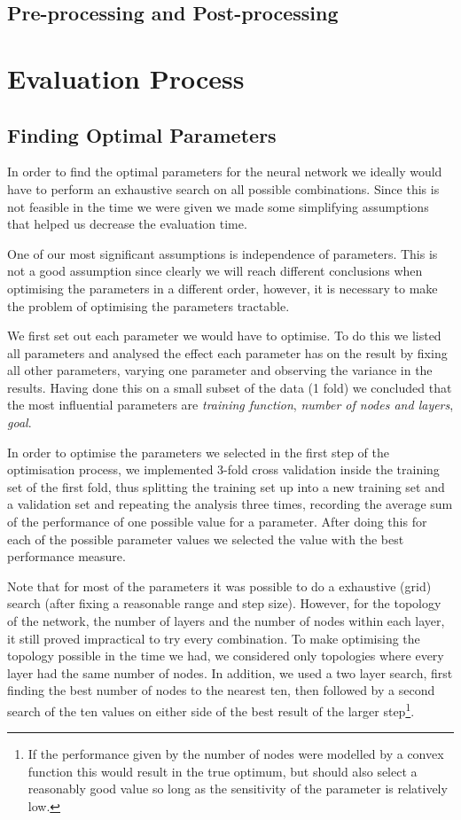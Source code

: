 \documentclass[10pt,a4paper]{article}
\begin{document}
\subsection{Pre-processing and Post-processing}



\section{Evaluation Process}

\subsection{Finding Optimal Parameters}
In order to find the optimal parameters for the neural network we ideally would have to perform an exhaustive search on all possible combinations. Since this is not feasible in the time we were given we made some simplifying assumptions that helped us decrease the evaluation time.

One of our most significant assumptions is independence of parameters. This is not a good assumption since clearly we will reach different conclusions when optimising the parameters in a different order, however, it is necessary to make the problem of optimising the parameters tractable.

We first set out each parameter we would have to optimise. To do this we listed all parameters and analysed the effect each parameter has on the result by fixing all other parameters, varying one parameter and observing the variance in the results. Having done this on a small subset of the data (1 fold) we concluded that the most influential parameters are \emph{training function}, \emph{number of nodes and layers}, \emph{goal}. %

In order to optimise the parameters we selected in the first step of the optimisation process, we implemented 3-fold cross validation inside the training set of the first fold, thus splitting the training set up into a new training set and a validation set and repeating the analysis three times, recording the average sum of the performance of one possible value for a parameter. After doing this for each of the possible parameter values we selected the value with the best performance measure.

Note that for most of the parameters it was possible to do a exhaustive (grid) search (after fixing a reasonable range and step size). However, for the topology of the network, the number of layers and the number of nodes within each layer, it still proved impractical to try every combination. To make optimising the topology possible in the time we had, we considered only topologies where every layer had the same number of nodes. In addition, we used a two layer search, first finding the best number of nodes to the nearest ten, then followed by a second search of the ten values on either side of the best result of the larger step\footnote{If the performance given by the number of nodes were modelled by a convex function this would result in the true optimum, but should also select a reasonably good value so long as the sensitivity of the parameter is relatively low.}.
\end{document}
